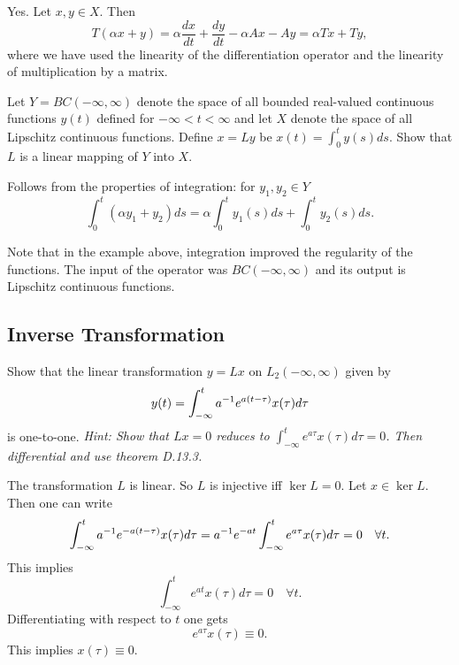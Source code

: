 \begin{solution}
	Yes. Let $ x,y\in X $. Then
	\[ T(\alpha x + y) = \alpha \frac{dx}{dt} + \frac{dy}{dt} - \alpha Ax - Ay=  \alpha Tx + Ty, \]
	where we have used the linearity of the differentiation operator and the linearity of multiplication by a matrix.
\end{solution}

\begin{problem}
	Let $ Y = BC(-\infty,\infty) $ denote the space of all bounded real-valued continuous functions $ y(t) $ defined for $ -\infty < t < \infty $ and let $ X $ denote the space of all Lipschitz continuous functions. Define $ x = Ly $ be $ x(t) = \int_{0}^{t}y(s)ds $. Show that $ L $ is a linear mapping of $ Y $ into $ X $.
\end{problem}
\begin{solution}
	Follows from the properties of integration: for $ y_1,y_2 \in Y $
	\[ \int_{0}^{t}(\alpha y_1+y_2)ds = \alpha \int_{0}^{t}y_1(s)ds + \int_{0}^{t}y_2(s)ds. \]
\end{solution}

\begin{remark}
	Note that in the example above, integration improved the regularity of the functions. The input of the operator was $ BC(-\infty,\infty) $ and its output is Lipschitz continuous functions.
\end{remark}



\subsection{Inverse Transformation}
\begin{problem}
	Show that the linear transformation $ y = Lx $ on $ L_2(-\infty,\infty) $ given by
	\[ y(t) = \int_{-\infty}^{t}a^{-1}e^{a(t-\tau)}x(\tau) d\tau \]
	is one-to-one. \emph{Hint: Show that $ Lx = 0 $ reduces to $ \int_{-\infty}^{t} e^{a\tau}x(\tau)d\tau = 0$. Then differential and use theorem D.13.3.}
\end{problem}
\begin{solution}
	The transformation $ L $ is linear. So $ L $ is injective iff $ \ker L = 0 $. Let $ x\in \ker L $. Then one can write
	\[ \int_{-\infty}^{t}a^{-1}e^{-a(t-\tau)}x(\tau) d\tau = a^{-1} e^{-at} \int_{-\infty}^{t}e^{a\tau}x(\tau) d\tau = 0 \quad \forall t. \]
	This implies
	\[ \int_{-\infty}^{t} e^{at}x(\tau)d\tau = 0 \quad \forall t. \]
	Differentiating with respect to $ t $ one gets
	\[ e^{a\tau}x(\tau) \equiv 0. \]
	This implies $ x(\tau) \equiv 0 $. 
\end{solution}

